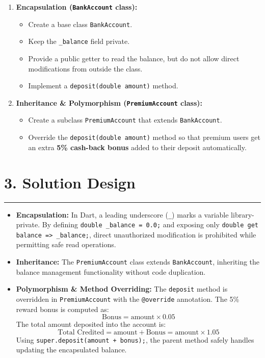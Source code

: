 \documentclass[11pt,a4paper]{article}
\begin{document}
\begin{enumerate}
    \setlength{\itemsep}{8pt}
    \item \textbf{Encapsulation (\texttt{BankAccount} class):}
    \begin{itemize}
        \setlength{\itemsep}{3pt}
        \item Create a base class \texttt{BankAccount}.
        \item Keep the \texttt{\_balance} field private.
        \item Provide a public getter to read the balance, but do not allow direct modifications from outside the class.
        \item Implement a \texttt{deposit(double amount)} method.
    \end{itemize}

    \item \textbf{Inheritance \& Polymorphism (\texttt{PremiumAccount} class):}
    \begin{itemize}
        \setlength{\itemsep}{3pt}
        \item Create a subclass \texttt{PremiumAccount} that extends \texttt{BankAccount}.
        \item Override the \texttt{deposit(double amount)} method so that premium users get an extra \textbf{5\% cash-back bonus} added to their deposit automatically.
    \end{itemize}
\end{enumerate}

\vspace{0.35cm}
\section*{3. Solution Design}
\noindent\rule{\textwidth}{0.5pt}\vspace{0.15cm}

\begin{itemize}
    \setlength{\itemsep}{4pt}
    \item \textbf{Encapsulation:} In Dart, a leading underscore (\texttt{\_}) marks a variable library-private. By defining \texttt{double \_balance = 0.0;} and exposing only \texttt{double get balance => \_balance;}, direct unauthorized modification is prohibited while permitting safe read operations.
    \item \textbf{Inheritance:} The \texttt{PremiumAccount} class extends \texttt{BankAccount}, inheriting the balance management functionality without code duplication.
    \item \textbf{Polymorphism \& Method Overriding:} The \texttt{deposit} method is overridden in \texttt{PremiumAccount} with the \texttt{@override} annotation. The 5\% reward bonus is computed as:
    \[
        \text{Bonus} = \text{amount} \times 0.05
    \]
    The total amount deposited into the account is:
    \[
        \text{Total Credited} = \text{amount} + \text{Bonus} = \text{amount} \times 1.05
    \]
    Using \texttt{super.deposit(amount + bonus);}, the parent method safely handles updating the encapsulated balance.
\end{itemize}
\end{document}
